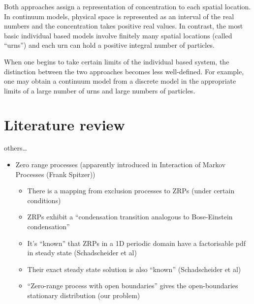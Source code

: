 Both approaches assign a representation of concentration to each
spatial location. In continuum models, physical space is represented as an
interval of the real numbers and the concentration takes positive real values.
In contrast, the most basic individual based models involve finitely many
spatial locations (called ``urns'') and each urn can hold a positive integral
number of particles.

When one begins to take certain limits of the individual based system, the
distinction between the two approaches becomes less well-defined. For example,
one may obtain a continuum model from a discrete model in the appropriate limits
of a large number of urns and large numbers of particles. 

\section{Literature review}
\cite{chernyavsky2011transport} \cite{chernyavsky2012characterizing}
others\ldots

\begin{itemize}
    \item Zero range processes (apparently introduced in Interaction of Markov
        Processes (Frank Spitzer))
        \begin{itemize}
            \item There is a mapping from exclusion processes to ZRPs (under
                certain conditions)
            \item ZRPs exhibit a ``condensation transition analogous to
                Bose-Einstein condensation''
            \item It's ``known'' that ZRPs in a 1D periodic domain have a
                factorisable pdf in steady state (Schadscheider et al)
            \item Their exact steady state solution is also ``known''
                (Schadscheider et al)
            \item ``Zero-range process with open boundaries'' gives the
                open-boundaries stationary distribution (our problem)
        \end{itemize}
\end{itemize}

